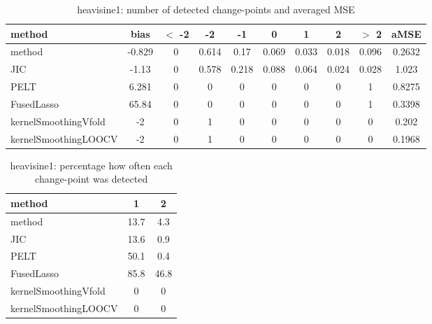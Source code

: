 \begin{table}[ht]
\centering
\begin{tabular}{l|c|ccccccc|c}
  \hline
method & bias & $<$ -2 & -2 & -1 & 0 & 1 & 2 & $>$ 2 & aMSE \\ 
  \hline
method & -0.829 &     0 & 0.614 &  0.17 & 0.069 & 0.033 & 0.018 & 0.096 & 0.2632 \\ 
  JIC & -1.13 &     0 & 0.578 & 0.218 & 0.088 & 0.064 & 0.024 & 0.028 & 1.023 \\ 
  PELT & 6.281 &     0 &     0 &     0 &     0 &     0 &     0 &     1 & 0.8275 \\ 
  FusedLasso & 65.84 &     0 &     0 &     0 &     0 &     0 &     0 &     1 & 0.3398 \\ 
  kernelSmoothingVfold &    -2 &     0 &     1 &     0 &     0 &     0 &     0 &     0 & 0.202 \\ 
  kernelSmoothingLOOCV &    -2 &     0 &     1 &     0 &     0 &     0 &     0 &     0 & 0.1968 \\ 
   \hline
\end{tabular}
\caption{heavisine1: number of detected change-points and averaged MSE} 
\label{tab:heavisine1Njumps}
\end{table}
\begin{table}[ht]
\centering
\begin{tabular}{l|cc}
  \hline
method & 1 & 2 \\ 
  \hline
method &   13.7 &    4.3 \\ 
  JIC &   13.6 &    0.9 \\ 
  PELT &   50.1 &    0.4 \\ 
  FusedLasso &   85.8 &   46.8 \\ 
  kernelSmoothingVfold &      0 &      0 \\ 
  kernelSmoothingLOOCV &      0 &      0 \\ 
   \hline
\end{tabular}
\caption{heavisine1: percentage how often each change-point was detected} 
\label{tab:heavisine1Detections}
\end{table}
